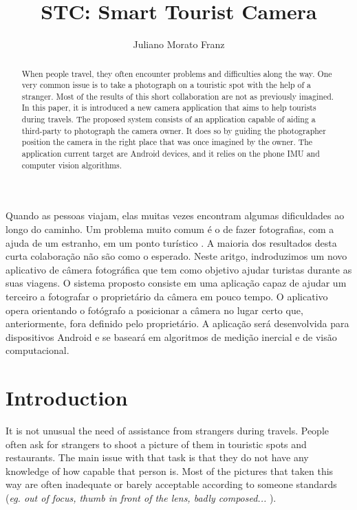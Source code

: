 \documentclass[12pt]{article}
\title{STC: Smart Tourist Camera}
\author{Juliano Morato Franz\inst{1}}
\begin{document}
 

\maketitle

\begin{abstract}
When people travel, they often encounter problems and difficulties along the way. One very common issue is to take a photograph on a touristic spot with the help of  a stranger. Most of the results of this short collaboration are not as previously imagined.  In this paper, it is introduced a new camera application that aims to help tourists during travels. The proposed system consists of an application capable of aiding a third-party to photograph the camera owner. It does so by guiding the photographer position the camera in the right place that was once imagined by the owner. The application current target are Android devices, and it relies on the phone IMU and computer vision algorithms.
\end{abstract}
     
\begin{resumo} 
Quando as pessoas viajam, elas muitas vezes encontram algumas dificuldades ao longo do caminho. Um problema muito comum é o de fazer fotografias, com a ajuda de um estranho, em um ponto turístico . A maioria dos resultados desta curta colaboração não são como o esperado. Neste aritgo, indroduzimos um novo aplicativo de câmera fotográfica que tem como objetivo ajudar turistas durante as suas viagens. O sistema proposto consiste em uma aplicação capaz de ajudar um terceiro a fotografar o proprietário da câmera em pouco tempo. O aplicativo opera orientando o fotógrafo a posicionar a câmera no lugar certo que, anteriormente, fora definido pelo proprietário. A aplicação será desenvolvida para dispositivos Android e se baseará em algoritmos de medição inercial e de visão computacional.
 \end{resumo}


\section{Introduction}

It is not unusual the need of assistance from strangers during travels. People often ask for strangers to shoot a picture of them in touristic spots and restaurants. The main issue with that task is that they do not have any knowledge of how capable that person is. Most of the pictures that taken this way are often inadequate or barely acceptable according to someone standards (\textit{eg. out of focus, thumb in front of the lens, badly composed... }).
\end{document}
